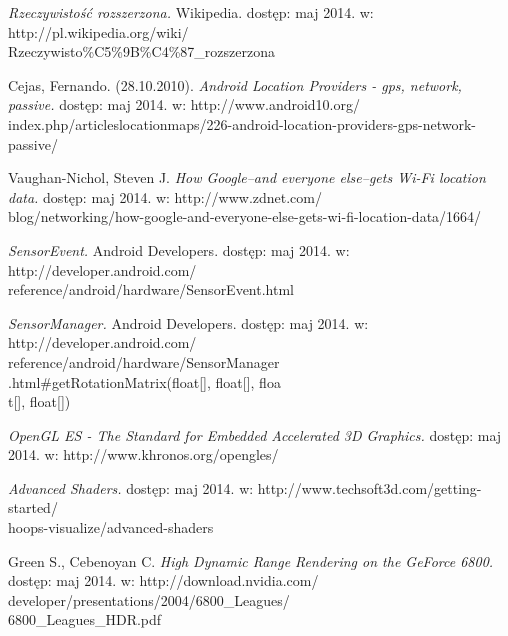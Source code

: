 \documentclass[a4paper,twocolumn,11pt]{article}
\begin{document}
\begin{thebibliography}{9}
 \small

  \emph{Rzeczywistość rozszerzona.}
                              Wikipedia.
                              dostęp: maj 2014.
                              w: http://pl.wikipedia.org/wiki/\\Rzeczywisto\%C5\%9B\%C4\%87\_rozszerzona

  Cejas, Fernando.
                   (28.10.2010).
                   \emph{Android Location Providers - gps, network, passive.}
                   dostęp: maj 2014.
                   w: http://www.android10.org/\\index.php/articleslocationmaps/226-android-location-providers-gps-network-passive/
 
  Vaughan-Nichol, Steven J.
                    \emph{How Google--and everyone else--gets Wi-Fi location data.}
                    dostęp: maj 2014.
                    w: http://www.zdnet.com/\\blog/networking/how-google-and-everyone-else-gets-wi-fi-location-data/1664/

  \emph{SensorEvent.}
                              Android Developers.
                              dostęp: maj 2014.
                              w: http://developer.android.com/\\reference/android/hardware/SensorEvent.html

  \emph{SensorManager.}
                              Android Developers.
                              dostęp: maj 2014.
                              w: http://developer.android.com/\\reference/android/hardware/SensorManager\\.html\#getRotationMatrix(float[], float[], floa\\t[], float[])

  \emph{OpenGL ES - The Standard for Embedded Accelerated 3D Graphics.}
                  dostęp: maj 2014.
                  w: http://www.khronos.org/opengles/

  \emph{Advanced Shaders.}
                  dostęp: maj 2014.
                  w: http://www.techsoft3d.com/getting-started/\\hoops-visualize/advanced-shaders

  Green S., Cebenoyan C.
                   \emph{High Dynamic Range Rendering on the GeForce 6800.}
                   dostęp: maj 2014.
                   w: http://download.nvidia.com/\\developer/presentations/2004/6800\_Leagues/\\6800\_Leagues\_HDR.pdf

\end{thebibliography}
\end{document}

